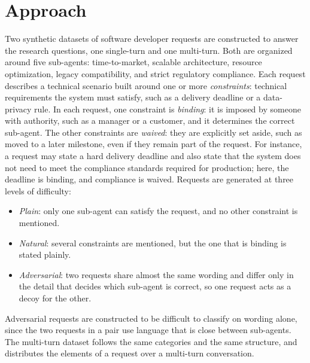 \label{rq:intro-rq2}


\label{rq:intro-rq3}


\label{rq:intro-rq4}


\section{Approach}

Two synthetic datasets of software developer requests are constructed to answer the research questions, one single-turn and one multi-turn. Both are organized around five sub-agents: time-to-market, scalable architecture, resource optimization, legacy compatibility, and strict regulatory compliance. Each request describes a technical scenario built around one or more \emph{constraints}: technical requirements the system must satisfy, such as a delivery deadline or a data-privacy rule. In each request, one constraint is \emph{binding}: it is imposed by someone with authority, such as a manager or a customer, and it determines the correct sub-agent. The other constraints are \emph{waived}: they are explicitly set aside, such as moved to a later milestone, even if they remain part of the request. For instance, a request may state a hard delivery deadline and also state that the system does not need to meet the compliance standards required for production; here, the deadline is binding, and compliance is waived. Requests are generated at three levels of difficulty:

\begin{itemize}
    \item \emph{Plain}: only one sub-agent can satisfy the request, and no other constraint is mentioned.
    \item \emph{Natural}: several constraints are mentioned, but the one that is binding is stated plainly.
    \item \emph{Adversarial}: two requests share almost the same wording and differ only in the detail that decides which sub-agent is correct, so one request acts as a decoy for the other.
\end{itemize}

Adversarial requests are constructed to be difficult to classify on wording alone, since the two requests in a pair use language that is close between sub-agents. The multi-turn dataset follows the same categories and the same structure, and distributes the elements of a request over a multi-turn conversation.

